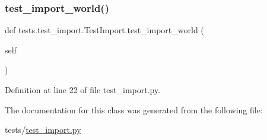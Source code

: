 \subsubsection{\texorpdfstring{test\+\_\+import\+\_\+world()}{test\_import\_world()}}
{\footnotesize\ttfamily def tests.\+test\+\_\+import.\+Test\+Import.\+test\+\_\+import\+\_\+world (\begin{DoxyParamCaption}\item[{}]{self }\end{DoxyParamCaption})}



Definition at line 22 of file test\+\_\+import.\+py.



The documentation for this class was generated from the following file\+:\begin{DoxyCompactItemize}
\item 
tests/\hyperlink{test__import_8py}{test\+\_\+import.\+py}\end{DoxyCompactItemize}
